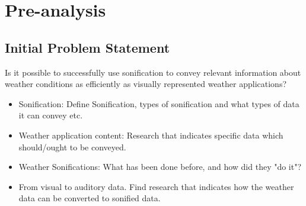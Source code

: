 \section{Pre-analysis} \label{sec:preanalysus}


\subsection{Initial Problem Statement}
Is it possible to successfully use sonification to convey relevant information about weather conditions as efficiently as visually represented weather applications?


\begin{itemize}
\item[]
Sonification: Define Sonification, types of sonification and what types of data it can convey etc.
\item[]
Weather application content:
Research that indicates specific data which should/ought to be conveyed.
\item[]
Weather Sonifications:
What has been done before, and how did they "do it"?
\item[]
From visual to auditory data.
Find research that indicates how the weather data can be converted to sonified data.
\end{itemize}